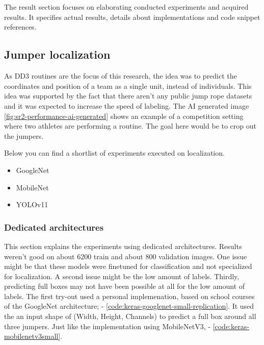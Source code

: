
\chapter{}%
\label{ch:results}

The result section focuses on elaborating conducted experiments and acquired results. It specifies actual results, details about implementations and code snippet references.

\section{Jumper localization}
\label{results:jumper-localization}

As DD3 routines are the focus of this research, the idea was to predict the coordinates and position of a team as a single unit, instead of individuals. This idea was supported by the fact that there aren't any public jump rope datasets and it was expected to increase the speed of labeling. The AI generated image \ref{fig:sr2-performance-ai-generated} shows an example of a competition setting where two athletes are performing a routine. The goal here would be to crop out the jumpers.


Below you can find a shortlist of experiments executed on localization.

\begin{itemize}
    \item GoogleNet
    \item MobileNet
    \item YOLOv11
\end{itemize}

\subsection{Dedicated architectures}

This section explains the experiments using dedicated architectures. Results weren't good on about 6200 train and about 800 validation images. One issue might be that these models were finetuned for classification and not specialized for localization. A second issue might be the low amount of labels. Thirdly, predicting full boxes may not have been possible at all for the low amount of labels.
The first try-out used a personal implemenation, based on school courses of the GoogleNet architecture; \autocite{Szegedy2014} - \ref{code:keras-googlenet-small-replication}.
It used the an input shape of (Width, Height, Channels) to predict a full box around all three jumpers. Just like the implementation using MobileNetV3, \autocite{Howard2019} - \ref{code:keras-mobilenetv3small}.


